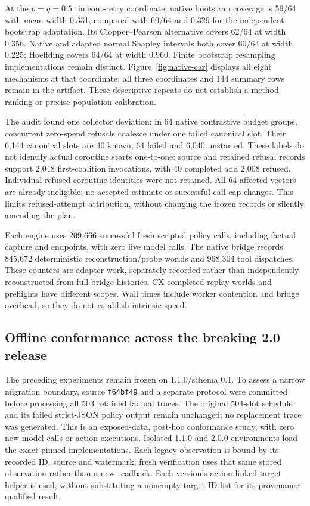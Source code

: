 \documentclass[conference]{IEEEtran}
\begin{document}
At the $p=q=0.5$ timeout-retry coordinate, native bootstrap coverage is
59/64 with mean width 0.331, compared with 60/64 and 0.329 for the independent
bootstrap adaptation. Its Clopper--Pearson alternative covers 62/64 at width
0.356. Native and adapted normal Shapley intervals both cover 60/64 at width
0.225; Hoeffding covers 64/64 at width 0.960. Finite bootstrap resampling
implementations remain distinct. Figure~\ref{fig:native-car} displays all
eight mechanisms at that coordinate; all three coordinates and 144 summary
rows remain in the artifact. These descriptive repeats do not establish a
method ranking or precise population calibration.

The audit found one collector deviation: in 64 native contrastive budget
groups, concurrent zero-spend refusals coalesce under one failed canonical
slot. Their 6,144 canonical slots are 40 known, 64 failed and 6,040 unstarted.
These labels do not identify actual coroutine starts one-to-one: source and
retained refusal records support 2,048 first-coalition invocations, with
40 completed and 2,008 refused. Individual refused-coroutine identities were
not retained. All 64 affected vectors are already ineligible; no accepted
estimate or successful-call cap changes. This limits refused-attempt
attribution, without changing the frozen records or silently amending the plan.

Each engine uses 209,666 successful fresh scripted policy calls, including
factual capture and endpoints, with zero live model calls. The native bridge
records 845,672 deterministic reconstruction/probe worlds and 968,304 tool
dispatches. These counters are adapter work, separately recorded rather than
independently reconstructed from full bridge histories. CX completed replay
worlds and preflights have different scopes. Wall times include worker
contention and bridge overhead, so they do not establish intrinsic speed.

\subsection{Offline conformance across the breaking 2.0 release}
The preceding experiments remain frozen on 1.1.0/schema 0.1. To assess a
narrow migration boundary, source \texttt{f64bf49} and a separate protocol
were committed before processing all 503 retained factual traces. The
original 504-slot schedule and its failed strict-JSON policy output remain
unchanged; no replacement trace was generated. This is an exposed-data,
post-hoc conformance study, with zero new model calls or action executions.
Isolated 1.1.0 and 2.0.0 environments load the exact pinned implementations.
Each legacy observation is bound by its recorded ID, source and watermark;
fresh verification uses that same stored observation rather than a new
readback. Each version's action-linked target helper is used, without
substituting a nonempty target-ID list for its provenance-qualified result.
\end{document}
